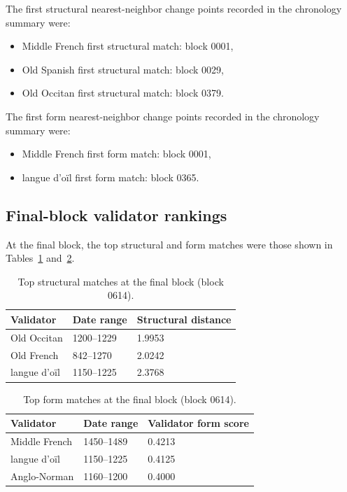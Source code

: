 \documentclass[11pt]{article}
\begin{document}
The first structural nearest-neighbor change points recorded in the chronology
summary were:

\begin{itemize}
    \item Middle French first structural match: block 0001,
    \item Old Spanish first structural match: block 0029,
    \item Old Occitan first structural match: block 0379.
\end{itemize}

The first form nearest-neighbor change points recorded in the chronology
summary were:

\begin{itemize}
    \item Middle French first form match: block 0001,
    \item langue d'o\"il first form match: block 0365.
\end{itemize}

\subsection{Final-block validator rankings}

At the final block, the top structural and form matches were those shown in
Tables~\ref{tab:finalstruct} and~\ref{tab:finalform}.

\begin{table}[h]
\centering
\caption{Top structural matches at the final block (block 0614).}
\label{tab:finalstruct}
\begin{tabular}{lll}
\toprule
Validator & Date range & Structural distance \\
\midrule
Old Occitan & 1200--1229 & 1.9953 \\
Old French & 842--1270 & 2.0242 \\
langue d'o\"il & 1150--1225 & 2.3768 \\
\bottomrule
\end{tabular}
\end{table}

\begin{table}[h]
\centering
\caption{Top form matches at the final block (block 0614).}
\label{tab:finalform}
\begin{tabular}{lll}
\toprule
Validator & Date range & Validator form score \\
\midrule
Middle French & 1450--1489 & 0.4213 \\
langue d'o\"il & 1150--1225 & 0.4125 \\
Anglo-Norman & 1160--1200 & 0.4000 \\
\bottomrule
\end{tabular}
\end{table}
\end{document}

